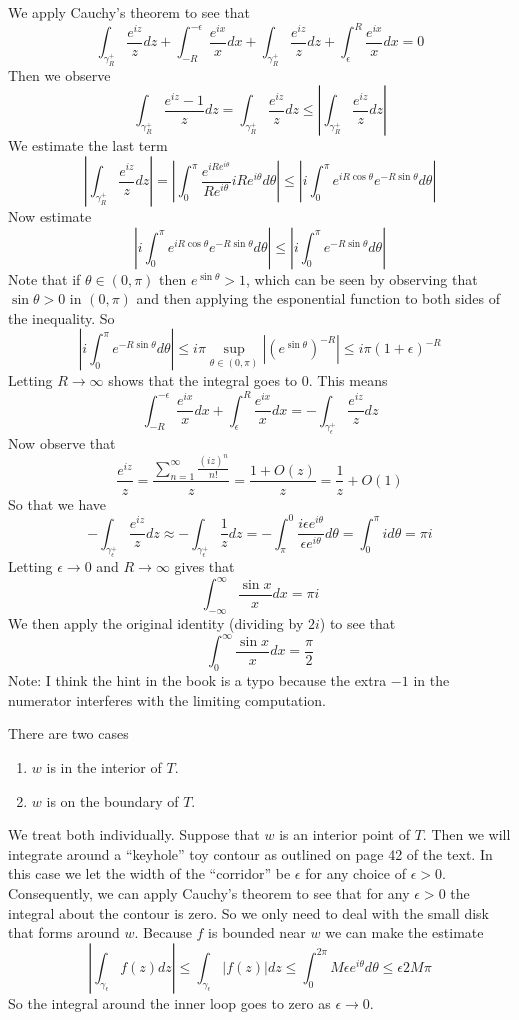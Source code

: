\documentclass{article}
\newcommand{\exercise}[1]{\noindent{\textbf{Exercise #1:}}}
\begin{document}
We apply Cauchy's theorem to see that
\[
\int_{\gamma_R^+} \frac{e^{iz}}{z}dz + \int_{-R}^{-\epsilon}
\frac{e^{ix}}{x}dx + \int_{\gamma_R^+} \frac{e^{iz}}{z}dz +
\int_{\epsilon}^{R} \frac{e^{ix}}{x}dx = 0
\]
Then we observe
\[
\int_{\gamma_R^+} \frac{e^{iz}-1}{z}dz =
\int_{\gamma_R^+}\frac{e^{iz}}{z}dz \leq
\left|\int_{\gamma_R^+}\frac{e^{iz}}{z}dz\right|
\]
We estimate the last term
\[
\left|\int_{\gamma_R^+}\frac{e^{iz}}{z}dz\right| = \left|\int_{0}^\pi
  \frac{e^{iRe^{i\theta}}}{Re^{i\theta}}iRe^{i\theta}d\theta\right|
\leq \left|i\int_0^\pi e^{iR\cos\theta}e^{-R\sin \theta}d\theta\right|
\]
Now estimate
\[
\left|i\int_0^\pi e^{iR\cos\theta}e^{-R\sin \theta}d\theta\right| \leq
\left|i\int_0^\pi e^{-R\sin\theta}d\theta\right|
\]
Note that if $\theta \in (0,\pi)$ then $e^{\sin\theta} > 1$, which can
be seen by observing that $\sin\theta > 0$ in $(0,\pi)$ and then
applying the esponential function to both sides of the inequality. So
\[
\left|i\int_0^\pi e^{-R\sin\theta}d\theta\right| \leq i\pi
\sup_{\theta \in (0,\pi)}\left|(e^{\sin\theta})^{-R}\right| \leq i\pi
(1+\epsilon)^{-R}
\]
Letting $R\to \infty$ shows that the integral goes to $0$. This means
\[
\int_{-R}^{-\epsilon} \frac{e^{ix}}{x}dx + \int_{\epsilon}^{R}
\frac{e^{ix}}{x}dx = - \int_{\gamma_\epsilon^+} \frac{e^{iz}}{z}dz
\]
Now observe that
\[
\frac{e^{iz}}{z} = \frac{\sum_{n=1}^\infty\frac{(iz)^n}{n!}}{z} =
\frac{1 + O(z)}{z} = \frac{1}{z} + O(1)
\]
So that we have
\[
-\int_{\gamma_\epsilon^+} \frac{e^{iz}}{z}dz \approx
-\int_{\gamma_\epsilon^+} \frac{1}{z}dz = -\int_\pi^0 \frac{i\epsilon
  e^{i\theta}}{\epsilon e^{i\theta}}d\theta = \int_0^\pi id\theta =
\pi i
\]
Letting $\epsilon \to 0$ and $R \to \infty$ gives that
\[
\int_{-\infty}^\infty \frac{\sin x}{x}dx = \pi i
\]
We then apply the original identity (dividing by $2i$) to see that
\[
\int_{0}^\infty \frac{\sin x}{x}dx = \frac{\pi}{2}
\]
{
\footnotesize{Note: I think the hint in the book is a typo because
 the extra $-1$ in the numerator interferes with the limiting computation.
}}

\exercise{2.6.6}

There are two cases
\begin{enumerate}
\item $w$ is in the interior of $T$.
\item $w$ is on the boundary of $T$.
\end{enumerate}
We treat both individually. Suppose that $w$ is an interior point of
$T$. Then we will integrate around a ``keyhole'' toy contour as
outlined on page 42 of the text. In this case we let the width of the
``corridor'' be $\epsilon$ for any choice of $\epsilon >
0$. Consequently, we can apply Cauchy's theorem to see that for any
$\epsilon > 0$ the integral about the contour is zero. So we only need
to deal with the small disk that forms around $w$. Because $f$ is
bounded near $w$ we can make the estimate
\[
\left| \int_{\gamma_\epsilon} f(z)dz\right| \leq
\int_{\gamma_\epsilon}|f(z)|dz \leq \int_{0}^{2\pi} M\epsilon
e^{i\theta}d\theta \leq \epsilon 2M\pi
\]
So the integral around the inner loop goes to zero as $\epsilon \to 0$.
\end{document}
